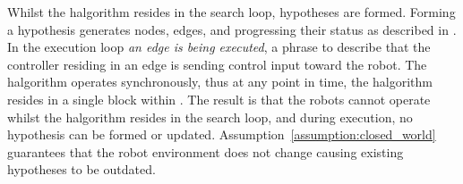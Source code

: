 Whilst the \ac{halgorithm} resides in the search loop, hypotheses are formed. Forming a hypothesis generates nodes, edges, and progressing their status as described in . In the execution loop \textit{an edge is being executed}, a phrase to describe that the controller residing in an edge is sending control input toward the robot. The \ac{halgorithm} operates synchronously, thus at any point in time, the \ac{halgorithm} resides in a single block within . The result is that the robots cannot operate whilst the \ac{halgorithm} resides in the search loop, and during execution, no hypothesis can be formed or updated. Assumption~\ref{assumption:closed_world} guarantees that the robot environment does not change causing existing hypotheses to be outdated.\bs

